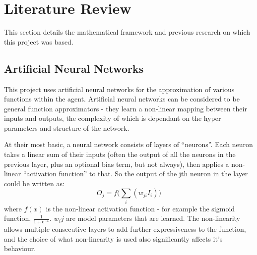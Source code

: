 \section{Literature Review}
This section details the mathematical framework and previous research on which this project was based.

\subsection{Artificial Neural Networks}
This project uses artificial neural networks for the approximation of various functions within the agent. Artificial neural networks can be considered to be general function approximators - they learn a non-linear mapping between their inputs and outputs, the complexity of which is dependant on the hyper parameters and structure of the network.

At their most basic, a neural network consists of layers of ``neurons''. Each neuron takes a linear sum of their inputs (often the output of all the neurons in the previous layer, plus an optional bias term, but not always), then applies a non-linear ``activation function'' to that.  So the output of the jth neuron in the layer could be written as:
\begin{equation}
O_j = f\big( \sum_i (w_{ji}I_i)\big)
\end{equation} where $f(x)$ is the non-linear activation function - for example the sigmoid function, $\frac{1}{1+ \text{e}^{-x}}$.  $w_ij$ are model parameters that are learned. The non-linearity allows multiple consecutive layers to add further expressiveness to the function, and the choice of what non-linearity is used also significantly affects it's behaviour.

